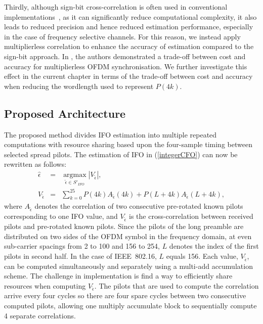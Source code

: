 Thirdly, although sign-bit cross-correlation is often used in conventional implementations~\cite{Kim2008,Schwoerer2002}, as it can significantly reduce computational complexity, it also leads to reduced precision and hence reduced estimation performance, especially in the case of frequency selective channels.
For this reason, we instead apply multiplierless correlation to enhance the accuracy of estimation compared to the sign-bit approach.
In \cite{Pham2012}, the authors demonstrated a trade-off between cost and accuracy for multiplierless OFDM synchronisation.
We further investigate this effect in the current chapter in terms of the trade-off between cost and accuracy when reducing the wordlength used to represent $P(4k)$.

\subsection{Proposed Architecture}
\label{subsec:Imple}
The proposed method divides IFO estimation into multiple repeated computations with resource sharing based upon the four-sample timing between selected spread pilots.
The estimation of IFO in (\ref{integerCFO}) can now be rewritten as follows:
\begin{eqnarray}
\label{proposedimplementIFO}
\hat{\epsilon}  &=&\underset{\tilde{\epsilon} \in S'_{IFO}}{\operatorname{argmax}}  \left|V_{\tilde{\epsilon}}  \right|,	 \nonumber \\
V_{\tilde{\epsilon}} &=& \sum_{k=0}^{25} P(4k) A_{\tilde{\epsilon}}(4k) + P(L+4k)  A_{\tilde{\epsilon}}(L+4k),
\end{eqnarray}
where $A_{\tilde{\epsilon}}$ denotes the correlation of two consecutive pre-rotated known pilots corresponding to one IFO value, and $V_{\tilde{\epsilon}}$ is the cross-correlation between received pilots and pre-rotated known pilots.
Since the pilots of the long preamble are distributed on two sides of the OFDM symbol in the frequency domain, at even sub-carrier spacings from 2 to 100 and 156 to 254, $L$ denotes the index of the first pilots in second half.
In the case of IEEE~802.16, $L$ equals 156.
Each value, $V_{\tilde{\epsilon}}$, can be computed simultaneously and separately using a multi-add accumulation scheme.
The challenge in implementation is find a way to efficiently share resources when computing $V_{\tilde{\epsilon}}$.
The pilots that are used to compute the correlation arrive every four cycles so there are four spare cycles between two consecutive computed pilots, allowing one multiply accumulate block to sequentially compute 4 separate correlations.

